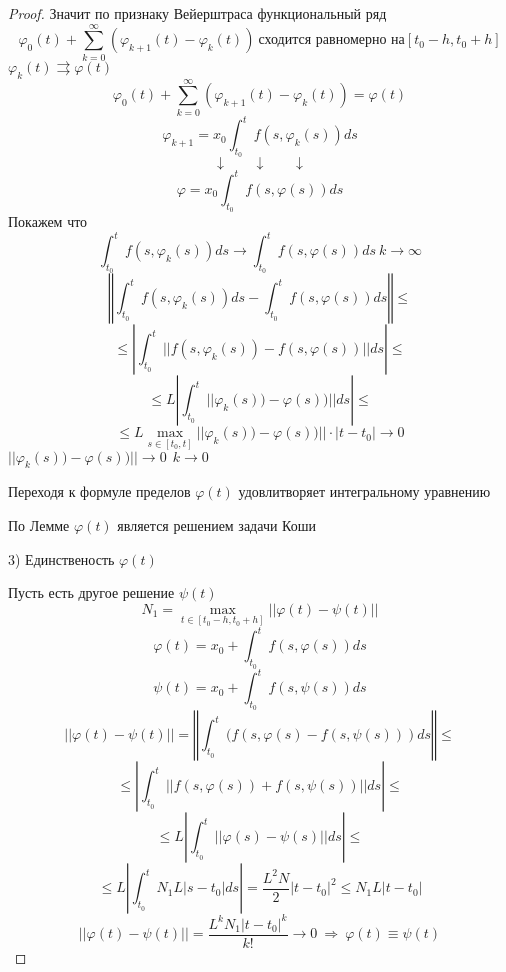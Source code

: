 \begin{proof}
  Значит по признаку Вейерштраса функциональный ряд
  $$
  \varphi_0(t) + \sum_{k=0}^{\infty} (\varphi_{k+1}(t) - \varphi_k(t)) ~
  \text{сходится равномерно на} [t_0 - h, t_0 + h]
  $$
  $\varphi_k(t) \rightrightarrows \varphi(t)$
  $$
  \varphi_0(t) + \sum_{k=0}^{\infty} (\varphi_{k+1}(t) - \varphi_k(t)) =
  \varphi(t)
  $$
  $$
  \varphi_{k+1} = x_0 \int_{t_0}^t f(s, \varphi_k(s))ds
  $$
  $$
  \downarrow ~~~~~~~~ \downarrow ~~~~~~~~ \downarrow
  $$
  $$
  \varphi = x_0 \int_{t_0}^t f(s, \varphi(s))ds
  $$
  Покажем что
  $$
  \int_{t_0}^t f(s, \varphi_k(s))ds \to \int_{t_0}^t f(s, \varphi(s))ds ~
  k \to \infty
  $$
  $$
  \left\Vert \int_{t_0}^t f(s, \varphi_k(s))ds - \int_{t_0}^t
  f(s, \varphi(s))ds \right\Vert \le
  $$
  $$
  \le \left| \int_{t_0}^t ||f(s, \varphi_k(s)) -
  f(s, \varphi(s))||ds \right| \le
  $$
  $$
  \le L \left|\int_{t_0}^t ||\varphi_k(s)) - \varphi(s))||ds \right| \le
  $$
  $$
  \le L\max_{s \in [t_0, t]} ||\varphi_k(s)) - \varphi(s))|| \cdot |t-t_0|
  \to 0
  $$
  $||\varphi_k(s)) - \varphi(s))|| \to 0 ~~ k \to 0$

  Переходя к формуле пределов $\varphi(t)$ удовлитворяет интегральному
  уравнению

  По Лемме $\varphi(t)$ является решением задачи Коши

  3) Единственость $\varphi(t)$

  Пусть есть другое решение $\psi(t)$
  $$
  N_1 = \max_{t\in [t_0-h, t_0+h]} ||\varphi(t) - \psi(t)||
  $$
  $$
  \varphi(t) = x_0 + \int_{t_0}^t f(s, \varphi(s))ds
  $$
  $$
  \psi(t) = x_0 + \int_{t_0}^t f(s, \psi(s))ds
  $$
  $$
  ||\varphi(t) - \psi(t)|| = \left\Vert \int_{t_0}^t (f(s, \varphi(s) -
  f(s, \psi(s)))ds \right\Vert \le
  $$
  $$
  \le \left| \int_{t_0}^t ||f(s, \varphi(s)) + f(s, \psi(s))||ds \right| \le
  $$
  $$
  \le L \left| \int_{t_0}^t ||\varphi(s) - \psi(s)||ds \right| \le
  $$
  $$
  \le L \left| \int_{t_0}^t N_1 L |s-t_0|ds \right| = \frac{L^2N}{2}|t-t_0|^2
  \le N_1 L |t-t_0|
  $$
  $$
  ||\varphi(t) - \psi(t)|| = \frac{L^kN_1|t-t_0|^k}{k!} \to 0 ~ \Rightarrow ~
  \varphi(t) \equiv \psi(t)
  $$
\end{proof}